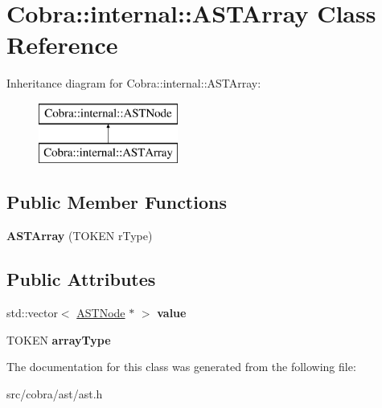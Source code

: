 \hypertarget{class_cobra_1_1internal_1_1_a_s_t_array}{\section{Cobra\+:\+:internal\+:\+:A\+S\+T\+Array Class Reference}
\label{class_cobra_1_1internal_1_1_a_s_t_array}
}
Inheritance diagram for Cobra\+:\+:internal\+:\+:A\+S\+T\+Array\+:\begin{figure}[H]
\begin{center}
\leavevmode
\includegraphics[height=2.000000cm]{class_cobra_1_1internal_1_1_a_s_t_array}
\end{center}
\end{figure}
\subsection*{Public Member Functions}
\begin{DoxyCompactItemize}
\item 
\hypertarget{class_cobra_1_1internal_1_1_a_s_t_array_a7e73df9cce52c269cd22e60bc6483fdf}{{\bfseries A\+S\+T\+Array} (T\+O\+K\+E\+N r\+Type)}\label{class_cobra_1_1internal_1_1_a_s_t_array_a7e73df9cce52c269cd22e60bc6483fdf}

\end{DoxyCompactItemize}
\subsection*{Public Attributes}
\begin{DoxyCompactItemize}
\item 
\hypertarget{class_cobra_1_1internal_1_1_a_s_t_array_a5e06b381684e0af6cd91e7b638172b90}{std\+::vector$<$ \hyperlink{class_cobra_1_1internal_1_1_a_s_t_node}{A\+S\+T\+Node} $\ast$ $>$ {\bfseries value}}\label{class_cobra_1_1internal_1_1_a_s_t_array_a5e06b381684e0af6cd91e7b638172b90}

\item 
\hypertarget{class_cobra_1_1internal_1_1_a_s_t_array_a13ba0e96bfc8ede1589a2da9c4bbcf8b}{T\+O\+K\+E\+N {\bfseries array\+Type}}\label{class_cobra_1_1internal_1_1_a_s_t_array_a13ba0e96bfc8ede1589a2da9c4bbcf8b}

\end{DoxyCompactItemize}


The documentation for this class was generated from the following file\+:\begin{DoxyCompactItemize}
\item 
src/cobra/ast/ast.\+h\end{DoxyCompactItemize}
